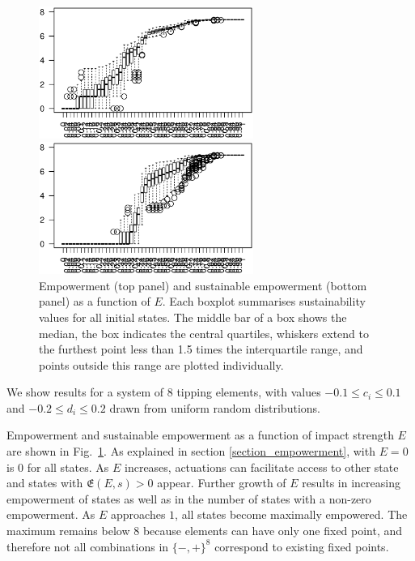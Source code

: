 \documentclass[conference]{IEEEtran}
\newcommand{\empowerment}{\ensuremath{\mathfrak{E}}}
\newcommand{\couplingconstant}{\ensuremath{d}}
\newcommand{\impactstrength}{\ensuremath{E}}
\begin{document}
\begin{figure}
  \begin{center}

    \includegraphics[width=7cm]{n08_full_small_emp.eps}

    \includegraphics[width=7cm]{n08_full_small_empsust.eps}

  \end{center}

  \caption{Empowerment (top panel) and sustainable empowerment
    (bottom panel) as a function of $\impactstrength$. Each boxplot summarises
    sustainability values for all initial states. The middle bar of
    a box shows the median, the box indicates the central quartiles,
    whiskers extend to the furthest point less than 1.5 times the
    interquartile range, and points outside this range are plotted
    individually.}
  \label{fig_empowermentprofiles}
\end{figure}

We show results for a system of $8$ tipping elements, with values
$-0.1 \le c_i \le 0.1$ and $-0.2 \le \couplingconstant_i \le 0.2$
drawn from uniform random distributions.

Empowerment and sustainable empowerment as a function of impact
strength $\impactstrength$ are shown in Fig.~\ref{fig_empowermentprofiles}. As
explained in section \ref{section_empowerment}, with $\impactstrength =
0$ is $0$ for all states. As $\impactstrength$ increases, actuations can facilitate
access to other state and states with $\empowerment(E, s) > 0$ appear.
Further growth of $\impactstrength$ results in increasing empowerment of states as
well as in the number of states with a non-zero empowerment. As $\impactstrength$
approaches $1$, all states become maximally empowered. The maximum
remains below $8$ because elements can have only one fixed point, and
therefore not all combinations in $\{-, +\}^{8}$ correspond to
existing fixed points.
\end{document}
